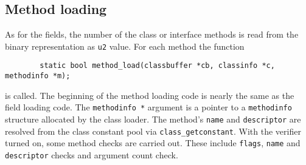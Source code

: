 \subsection{Method loading}

As for the fields, the number of the class or interface methods is read from
the binary representation as \texttt{u2} value. For each method the function

\begin{verbatim}
        static bool method_load(classbuffer *cb, classinfo *c, methodinfo *m);
\end{verbatim}

is called. The beginning of the method loading code is nearly the same
as the field loading code. The \texttt{methodinfo *} argument is a
pointer to a \texttt{methodinfo} structure allocated by the class
loader. The method's \texttt{name} and \texttt{descriptor} are
resolved from the class constant pool via
\texttt{class\_getconstant}. With the verifier turned on, some method
checks are carried out. These include \texttt{flags}, \texttt{name}
and \texttt{descriptor} checks and argument count check.

